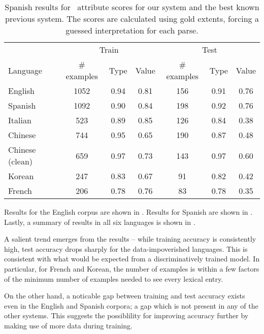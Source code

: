 \begin{table*}
	\begin{center}
	\begin{tabular}{|l|c|c|c|c|c|c|}
		\hline
		       & \multicolumn{3}{c|}{Train} & \multicolumn{3}{c|}{Test} \\
		Language & \# examples & Type & Value  & \# examples & Type & Value \\
		\hline
		\hline
		English          & 1052 & 0.94 & 0.81  & 156 & 0.91 & 0.76 \\
		Spanish          & 1092 & 0.90 & 0.84  & 198 & 0.92 & 0.76 \\
		Italian          & 523  & 0.89 & 0.85  & 126 & 0.84 & 0.38 \\
		Chinese          & 744  & 0.95 & 0.65  & 190 & 0.87 & 0.48 \\
		Chinese (clean)  & 659  & 0.97 & 0.73  & 143 & 0.97 & 0.60 \\
		Korean           & 247  & 0.83 & 0.67  & 91  & 0.82 & 0.42 \\
		French           & 206  & 0.78 & 0.76  & 83  & 0.78 & 0.35 \\
		\hline
	\end{tabular}
	\caption{
		Spanish results for \tempeval\ attribute scores for our system and
      the best known previous system.
		The scores are calculated using gold extents, forcing a guessed
		interpretation for each parse.
		\label{tab:results-all}
	}
	\end{center}
\end{table*}

Results for the English corpus are shown in .
Results for Spanish are shown in .
Lastly, a summary of results in all six languages is shown in
  .

A salient trend emerges from the results -- while training accuracy is
  consistently high, test accuracy drops sharply for the data-impoverished
  languages.
This is consistent with what would be expected from a discriminatively trained
  model.
In particular, for French and Korean, the number of examples is within a
  few factors of the minimum number of examples needed to see every
  lexical entry.

On the other hand, a noticable gap between training and test accuracy exists
  even in the English and Spanish corpora; a gap which is not present in any
  of the other systems.
This suggests the possiblility for improving accuracy further by making use of
  more data during training.
